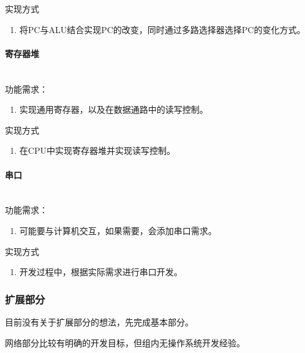                 实现方式
                \begin{enumerate}
                \item
                将PC与ALU结合实现PC的改变，同时通过多路选择器选择PC的变化方式。
                \end{enumerate}

            \paragraph{寄存器堆}
                \mbox{} \\ 

                功能需求：
                \begin{enumerate}
                \item
                实现通用寄存器，以及在数据通路中的读写控制。
                \end{enumerate}

                实现方式
                \begin{enumerate}
                \item
                在CPU中实现寄存器堆并实现读写控制。
                \end{enumerate}

            \paragraph{串口}
                \mbox{} \\

                功能需求：
                \begin{enumerate}
                \item
                可能要与计算机交互，如果需要，会添加串口需求。
                \end{enumerate}

                实现方式
                \begin{enumerate}
                \item
                开发过程中，根据实际需求进行串口开发。
                \end{enumerate}
        \subsubsection{扩展部分}
            目前没有关于扩展部分的想法，先完成基本部分。

            网络部分比较有明确的开发目标，但组内无操作系统开发经验。

